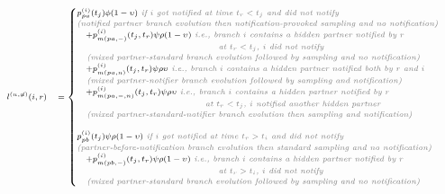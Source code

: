 \documentclass[10pt,letterpaper]{article}
\begin{document}
\begin{equation}
\scriptsize
\begin{array}{ll}
l^{(n,\not{n})}(i,r) &= \begin{cases}
p_{pa}^{(i)}(t_j)\phi(1 - \upsilon) \textit{\color{gray} ~if $i$ got notified at time $t_r < t_j$ and did not notify}\\
\textit{\color{gray} (notified partner branch evolution then notification-provoked sampling and no notification)}
\\
~~~+p_{m(pa,-)}^{(i)}(t_j,t_r)\psi\rho(1-\upsilon) \textit{\color{gray} ~i.e., branch $i$ contains a hidden partner notified by $r$}\\
\textit{\color{gray} ~~~~~~~~~~~~~~~~~~~~~~~~~~~~~~~~~~~~~~~~~~~at $t_r < t_j$, $i$  did not notify}\\
 \textit{\color{gray} ~~~(mixed partner-standard branch evolution followed by sampling and no notification)}\\
 ~~~+p_{m(pa,n)}^{(i)}(t_j,t_r)\psi\rho\upsilon \textit{\color{gray} ~i.e., branch $i$ contains a hidden partner notified both by $r$ and $i$}\\
 \textit{\color{gray} ~~~(mixed partner-notifier branch evolution followed by sampling and notification)}
\\
~~~+p_{m(pa,-,n)}^{(i)}(t_j,t_r)\psi\rho\upsilon  \textit{\color{gray} ~i.e., branch $i$ contains a hidden partner notified by $r$}\\
\textit{\color{gray} ~~~~~~~~~~~~~~~~~~~~~~~~~~~~~~~~~~~~~~~at $t_r < t_j$, $i$ notified another hidden partner}\\
 \textit{\color{gray} ~~~(mixed partner-standard-notifier branch evolution then sampling and notification)}
\\
\\
p_{pb}^{(i)}(t_j)\psi\rho(1 - \upsilon) \textit{\color{gray} ~if $i$ got notified at time $t_r > t_i$ and did not notify}\\
\textit{\color{gray} (partner-before-notification branch evolution then standard sampling and no notification)}
\\
~~~+p_{m(pb,-)}^{(i)}(t_j,t_r)\psi\rho(1-\upsilon) \textit{\color{gray} ~i.e., branch $i$ contains a hidden partner notified by $r$}\\
\textit{\color{gray} ~~~~~~~~~~~~~~~~~~~~~~~~~~~~~~~~~~~~~~~~~~~at $t_r > t_i$,  $i$  did not notify}\\
 \textit{\color{gray} ~~~(mixed partner-standard branch evolution followed by sampling and no notification)}\\

\end{cases}
\end{array}
\end{equation}
\end{document}

